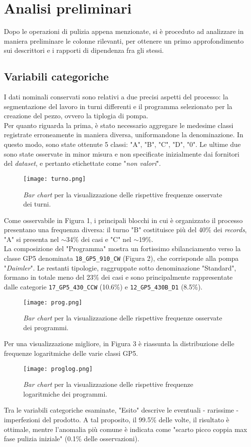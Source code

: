 \documentclass[fleqn,10pt]{SelfArx} %
\begin{document}
\section{Analisi preliminari}
Dopo le operazioni di pulizia appena menzionate, si è proceduto ad analizzare in maniera preliminare le colonne rilevanti, per ottenere un primo approfondimento sui descrittori e i rapporti di dipendenza fra gli stessi. 
\subsection{Variabili categoriche}
I dati nominali conservati sono relativi a due precisi aspetti del processo: la segmentazione del lavoro in turni differenti e il programma selezionato per la creazione del pezzo, ovvero la tiplogia di pompa.\\
Per quanto riguarda la prima, è stato necessario aggregare le medesime classi registrate erroneamente in maniera diversa, uniformandone la denominazione. In questo modo, sono state ottenute 5 classi: "A", "B", "C", "D", "0". Le ultime due sono state osservate in minor misura e non specificate inizialmente dai fornitori del \textit{dataset}, e pertanto etichettate come "\textit{non valori}".
\begin{figure}[h]
    \centering
    \texttt{[image: turno.png]}
    \label{fig:em}
    \caption{\textit{Bar chart} per la visualizzazione delle rispettive frequenze osservate dei turni.}
\end{figure}
Come osservabile in Figura 1, i principali blocchi in cui è organizzato il processo presentano una frequenza diversa: il turno "B" costituisce più del 40\% dei \textit{records}, "A" si presenta nel $\sim$34\% dei casi e "C" nel $\sim$19\%.\\
La composizione del "Programma" mostra un fortissimo sbilanciamento verso la classe GP5 denominata \texttt{18\_GP5\_910\_CW} (Figura 2), che corrisponde alla pompa "\textit{Daimler}". Le restanti tipologie, raggruppate sotto denominazione "Standard", formano in totale meno del 23\% dei casi e sono principalmente rappresentate dalle categorie \texttt{17\_GP5\_430\_CCW} (10.6\%) e \texttt{12\_GP5\_430B\_D1} (8.5\%).
\begin{figure}[h]
    \centering
    \texttt{[image: prog.png]}
    \label{fig:em}
    \caption{\textit{Bar chart} per la visualizzazione delle rispettive frequenze osservate dei programmi.}
\end{figure}
Per una visualizzazione migliore, in Figura 3 è riassunta la distribuzione delle frequenze logaritmiche delle varie classi GP5.
\begin{figure}[h]
    \centering
    \texttt{[image: proglog.png]}
    \label{fig:em}
    \caption{\textit{Bar chart} per la visualizzazione delle rispettive frequenze logaritmiche dei programmi.}
\end{figure}
Tra le variabili categoriche esaminate, "Esito" descrive le eventuali - rarissime - imperfezioni del prodotto. A tal proposito, il 99.5\% delle volte, il risultato è ottimale, mentre l'anomalia più comune è indicata come "scarto picco coppia max fase pulizia iniziale" (0.1\% delle osservazioni).
\end{document}
